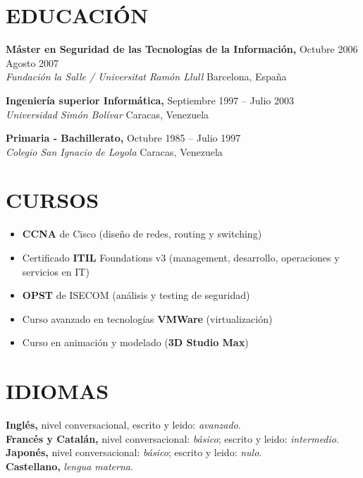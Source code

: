 \documentclass[line,margin]{res}
\begin{document}
\begin{resume}
\section{EDUCACI\'{O}N}
               \textbf{M\'{a}ster en Seguridad de las Tecnolog\'{i}as de la 
               Informaci\'{o}n,} \hfill Octubre 2006  Agosto 2007 \\
               \textit{Fundaci\'{o}n la Salle / Universitat Ram\'{o}n Llull} 
               \hfill Barcelona, Espa\~{n}a

               \textbf{Ingenier\'{i}a superior Inform\'{a}tica,} \hfill 
               Septiembre 1997 -- Julio 2003 \\
               \textit{Universidad Sim\'{o}n Bol\'{i}var} \hfill Caracas, 
               Venezuela

               \textbf{Primaria - Bachillerato,} \hfill Octubre 1985 -- Julio 
               1997 \\
               \textit{Colegio San Ignacio de Loyola} \hfill Caracas, Venezuela


 
\section{CURSOS}
               \begin{itemize}  \itemsep 2pt %
               \item \textbf{CCNA} de Cisco (dise\~{n}o de redes, routing  y 
               switching)
               \item Certificado \textbf{ITIL} Foundations v3 (management, 
               desarrollo, operaciones y servicios en IT)
               \item \textbf{OPST} de ISECOM (an\'{a}lisis y testing de 
               seguridad)
               \item Curso avanzado en tecnolog\'{i}as \textbf{VMWare} 
               (virtualizaci\'{o}n)
               \item Curso  en animaci\'{o}n y modelado (\textbf{3D Studio Max})
               \end{itemize}


\section{IDIOMAS} 
               \textbf{Ingl\'{e}s,}
               nivel conversacional, escrito y leido: \textit{avanzado}.
               \\
               \textbf{Franc\'{e}s y Catal\'{a}n,}
               nivel conversacional: \textit{b\'{a}sico}; escrito y leido: 
               \textit{intermedio}.
               \\
               \textbf{Japon\'{e}s,}
               nivel conversacional: \textit{b\'{a}sico}; escrito y leido: 
               \textit{nulo}.
               \\
               \textbf{Castellano,}
               \textit{lengua materna}.
               

\end{resume}
\end{document}
